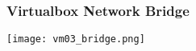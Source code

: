 \begin{frame}
\frametitle{Virtualbox Network Bridge}
    \center\texttt{[image: vm03\_bridge.png]}
\end{frame}
